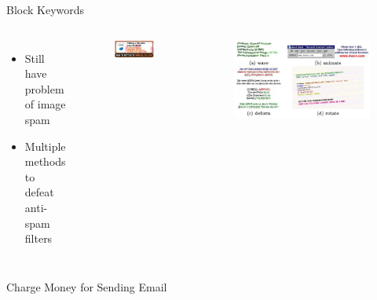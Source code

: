 \documentclass[nobackground,dvipsnames,table]{beamer}
\begin{document}
\begin{frame}{Block Keywords}
    \begin{columns}
            \begin{itemize}
                \item Still have problem of  image spam 
                \item Multiple methods to defeat anti-spam filters
            \end{itemize}
            \begin{figure}
                \centering
                \includegraphics[width=\textwidth]{viagra-ad}
            \end{figure}
            \begin{figure}
                \centering
                \includegraphics[width=\textwidth]{keyword-blocking-bypass}
            \end{figure}
    \end{columns}
\end{frame}

\begin{frame}{Charge Money for Sending Email}
\end{frame}
\end{document}
